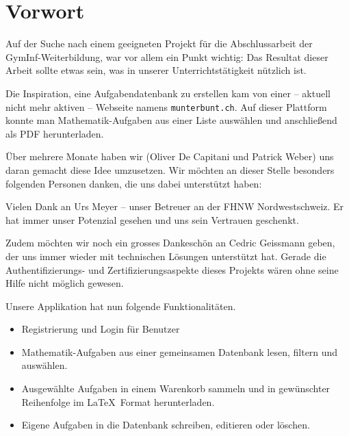 \section{Vorwort}

Auf der Suche nach einem geeigneten Projekt für die Abschlussarbeit der GymInf-Weiterbildung, war vor allem ein Punkt wichtig: Das Resultat dieser Arbeit sollte etwas sein, was in unserer Unterrichtstätigkeit nützlich ist. 

Die Inspiration, eine Aufgabendatenbank zu erstellen kam von einer -- aktuell nicht mehr aktiven -- Webseite namens \verb|munterbunt.ch|. Auf dieser Plattform konnte man Mathematik-Aufgaben aus einer Liste auswählen und anschließend als PDF herunterladen.

Über mehrere Monate haben wir (Oliver De Capitani und Patrick Weber) uns daran gemacht diese Idee umzusetzen. Wir möchten an dieser Stelle besonders folgenden Personen danken, die uns dabei unterstützt haben: 

Vielen Dank an Urs Meyer -- unser Betreuer an der FHNW Nordwestschweiz. Er hat immer unser Potenzial gesehen und uns sein Vertrauen geschenkt. 

Zudem möchten wir noch ein grosses Dankeschön an Cedric Geissmann geben, der uns immer wieder mit technischen Lösungen unterstützt hat. Gerade die Authentifizierungs- und Zertifizierungsaspekte dieses Projekts wären ohne seine Hilfe nicht möglich gewesen.

Unsere Applikation hat nun folgende Funktionalitäten.
\begin{itemize}
  \item Registrierung und Login für Benutzer
  \item Mathematik-Aufgaben aus einer gemeinsamen Datenbank lesen, filtern und auswählen.
  \item Ausgewählte Aufgaben in einem Warenkorb sammeln und in gewünschter Reihenfolge im \LaTeX\  Format herunterladen.
  \item Eigene Aufgaben in die Datenbank schreiben, editieren oder löschen.
\end{itemize}

